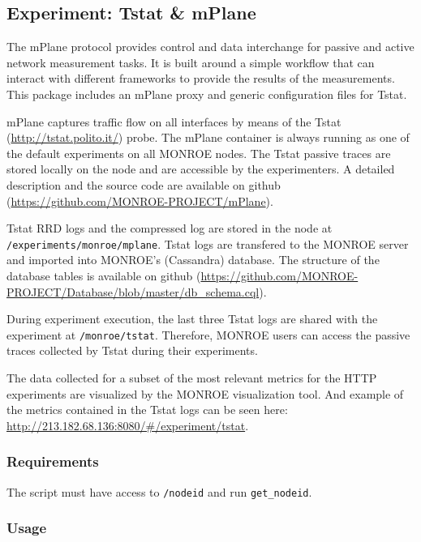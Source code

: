 \documentclass[a4paper,10pt]{article}
\newcommand{\monroe}{MONROE}
\newcommand{\identifier}[1]{{\texttt{\small{#1}}}}
\begin{document}
\subsection{Experiment: Tstat \& mPlane}

The mPlane protocol provides control and data interchange for passive and active network measurement tasks.
It is built around a simple workflow that can interact with different frameworks to provide the results of the measurements.
This package includes an mPlane proxy and generic configuration files for Tstat.

mPlane captures traffic flow on all interfaces by means of the Tstat (\url{http://tstat.polito.it/}) probe.
The mPlane container is always running as one of the default experiments on all \monroe{} nodes.
The Tstat passive traces are stored locally on the node and are accessible by the experimenters.
A detailed description and the source code are available on github (\url{https://github.com/MONROE-PROJECT/mPlane}).

Tstat RRD logs and the compressed log are stored in the node at \identifier{/experiments/monroe/mplane}.
Tstat logs are transfered to the \monroe{} server and imported into \monroe{}'s (Cassandra) database.
The structure of the database tables is available on github (\url{https://github.com/MONROE-PROJECT/Database/blob/master/db_schema.cql}).

During experiment execution, the last three Tstat logs are shared with the experiment at \identifier{/monroe/tstat}.
Therefore, \monroe{} users can access the passive traces collected by Tstat during their experiments.

The data collected for a subset of the most relevant metrics for the HTTP experiments are visualized by the \monroe{} visualization tool.
And example of the metrics contained in the Tstat logs can be seen here: \url{http://213.182.68.136:8080/#/experiment/tstat}.

\subsubsection{Requirements}

The script must have access to \identifier{/nodeid} and run \identifier{get\_nodeid}.

\subsubsection{Usage}
\end{document}
